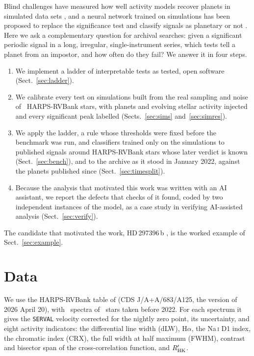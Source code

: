 Blind challenges have measured how well activity models recover planets in
simulated data sets \citep{Dumusque2017,Zhao2022}, and a neural network trained on
simulations has been proposed to replace the significance test and classify signals as
planetary or not \citep{Nieto2023}. Here we ask a complementary
question for archival searches: given a significant periodic signal in a long,
irregular, single-instrument series, which tests tell a planet from an
impostor, and how often do they fail? We answer it in four steps.
\begin{enumerate}
\item We implement a ladder of interpretable tests as tested, open software
      (Sect.~\ref{sec:ladder}).
\item We calibrate every test on simulations built from the real sampling and
      noise of \nmSimStars\ HARPS-RVBank stars, with planets and evolving stellar
      activity injected and every significant peak labelled
      (Sects.~\ref{sec:sims} and~\ref{sec:simres}).
\item We apply the ladder, a rule whose thresholds were fixed before the benchmark was run, and
      classifiers trained only on the simulations to published signals around
      HARPS-RVBank stars whose later verdict is known (Sect.~\ref{sec:bench}), and to the
      archive as it stood in January 2022, against the planets published since
      (Sect.~\ref{sec:timesplit}).
\item Because the analysis that motivated this work was written with an AI
      assistant, we report the defects that checks of it found, coded by two
      independent instances of the model, as a case study in verifying AI-assisted analysis
      (Sect.~\ref{sec:verify}).
\end{enumerate}
The candidate that motivated the work, HD\,297396\,b \citep{Fraser2026}, is
the worked example of Sect.~\ref{sec:example}.

\section{Data}
\label{sec:data}

We use the HARPS-RVBank table of \citet{Perdelwitz2024} (CDS J/A+A/683/A125, the
version of 2026 April 20), with \nmRVBankSpectra\ spectra of \nmRVBankStars\ stars
taken before 2022. For each spectrum it gives the \texttt{SERVAL} velocity
\citep{Zechmeister2018} corrected for the nightly zero point, its uncertainty, and
eight activity indicators: the differential line width (dLW), H$\alpha$, the
Na\,\textsc{i} D1 index, the chromatic index (CRX), the full width at half maximum
(FWHM), contrast and bisector span of the cross-correlation function, and
$R'_{\rm HK}$.

